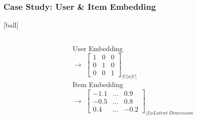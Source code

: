 \documentclass{beamer}
\begin{document}
\begin{frame}[fragile]
\frametitle{Case Study: User \& Item Embedding}
[ball]

\begin{columns}
\begin{column}{0.5\textwidth}
\begin{minipage}[c]{1\textwidth}
    \vspace{0.2cm}
    
\end{minipage}
\end{column}
\begin{column}{0.7\textwidth}
\hspace{1.5cm} User Embedding \\ 
\hspace{0.3cm} $\to$
\hspace{1.2cm} $\begin{bmatrix} 
1 & 0 & 0 \\ 
0 & 1 & 0 \\
0 & 0 & 1 
\end{bmatrix}_{|U|x|U|}$ \\
\vspace{0.3cm}
\hspace{1.5cm} Item Embedding \\ 
\hspace{0.3cm} $\to$
\hspace{0.4cm} $\begin{bmatrix}
-1.1 & \ldots & 0.9 \\
-0.5 & \ldots & 0.8\\
0.4 & \ldots & -0.2
\end{bmatrix}_{|I|x Latent \ Dimension}$
\end{column}
\end{columns}

\end{frame}

\end{document}
